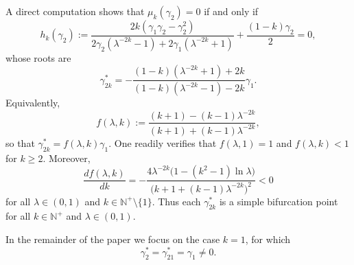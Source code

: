 \documentclass[reqno]{amsart}
\numberwithin{equation}{section}
\numberwithin{equation}{section}
\numberwithin{equation}{section}
\begin{document}
A direct computation shows that \(\mu_k(\gamma_2) = 0\) if and only if
\[h_k(\gamma_2):= \frac{2k\left(\gamma_1\gamma_2-\gamma_2^2\right)}{2\gamma_2\left(\lambda^{-2k}-1\right)+2\gamma_1\left(\lambda^{-2k}+1\right)}+\frac{(1-k)\gamma_2}{2}=0,\]
whose roots are
\begin{equation}\label{e4.10}
\gamma_{2k}^* = -\frac{(1-k)(\lambda^{-2k} + 1) + 2k}{(1-k)(\lambda^{-2k} - 1) - 2k} \gamma_1.
\end{equation}
Equivalently,
\begin{equation}
f(\lambda,k) := \frac{(k+1) - (k-1)\lambda^{-2k}}{(k+1) + (k-1)\lambda^{-2k}}, \nonumber
\end{equation}
so that \(\gamma_{2k}^* = f(\lambda,k) \gamma_1\). One readily verifies that \(f(\lambda,1) = 1\) and \(f(\lambda,k) < 1\) for \(k \geq 2\). Moreover,
\[
\frac{df(\lambda,k)}{dk} = -\frac{4\lambda^{-2k} \bigl(1 - (k^2 - 1)\ln\lambda\bigr)}{\bigl(k+1 + (k-1)\lambda^{-2k}\bigr)^2} < 0
\]
for all \(\lambda \in (0,1)\) and \(k \in \mathbb{N}^+ \setminus \{1\}\). Thus each \(\gamma_{2k}^*\) is a simple bifurcation point for all $k\in\mathbb{N}^+$ and \(\lambda \in (0,1)\).

In the remainder of the paper we focus on the case \(k=1\), for which
\begin{equation}
\gamma_2^* = \gamma_{21}^* = \gamma_1 \neq 0. \nonumber
\end{equation}
\end{document}
